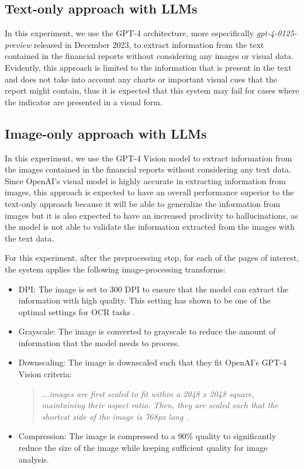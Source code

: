 \documentclass[english, 12pt, a4paper, elec, utf8, a-2b, online]{aaltothesis}
\begin{document}
\subsection{Text-only approach with \ac{LLM}s}

In this experiment, we use the \ac{GPT}-4 architecture, more especifically \textit{gpt-4-0125-preview} released in December 2023, to extract information from the text contained in the financial reports without considering any images or visual data.
Evidently, this approach is limited to the information that is present in the text and does not take into account any charts or important visual cues that the report might contain, thus it is expected that this system may fail for cases where the indicator are presented in a visual form.

\subsection{Image-only approach with \ac{LLM}s}

In this experiment, we use the \ac{GPT}-4 Vision model to extract information from the images contained in the financial reports without considering any text data.
Since OpenAI's visual model is highly accurate in extracting information from images, this approach is expected to have an overall performance superior to the text-only approach because it will be able to generalize the information from images but it is also expected to have an increased proclivity to hallucinations, as the model is not able to validate the information extracted from the images with the text data.

For this experiment, after the preprocessing step, for each of the pages of interest, the system applies the following image-processing transforms:

\begin{itemize}
\label{list:image_transforms}
    \item \ac{DPI}: The image is set to 300 \ac{DPI} to ensure that the model can extract the information with high quality. This setting has shown to be one of the optimal settings for \ac{OCR} tasks \cite{ocr_preprocessing2007}.
    \item Grayscale: The image is converted to grayscale to reduce the amount of information that the model needs to process.
    \item Downscaling: The image is downscaled such that they fit OpenAI's \ac{GPT}-4 Vision criteria:
    \begin{quote}
        \textit{...images are first scaled to fit within a 2048 x 2048 square, maintaining their aspect ratio. Then, they are scaled such that the shortest side of the image is 768px long \cite{OpenAIVisionAPI}.}
    \end{quote}
    \item Compression: The image is compressed to a 90\% quality to significantly reduce the size of the image while keeping sufficient quality for image analysis.
\end{itemize}
\end{document}
